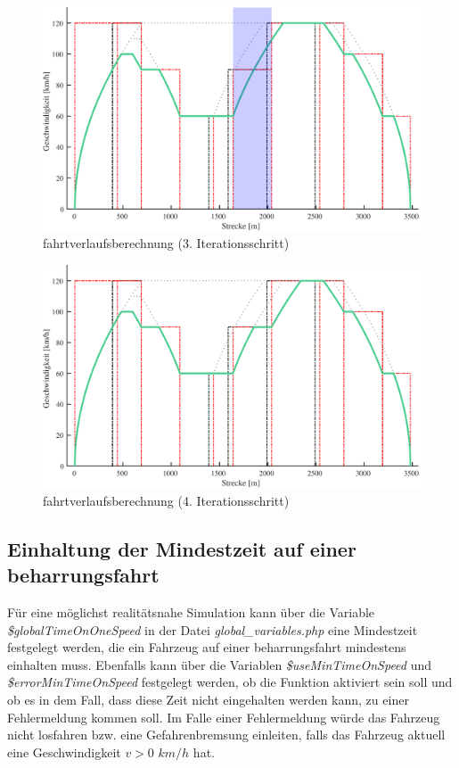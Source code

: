 \begin{figure}
\includegraphics[width=\linewidth]{../images/matlab/it5.pdf}
\caption{\Gls{fahrtverlauf}sberechnung (3. Iterationsschritt)}
\label{fig:it5}
\end{figure}
\begin{figure}
\includegraphics[width=\linewidth]{../images/matlab/it6.pdf}
\caption{\Gls{fahrtverlauf}sberechnung (4. Iterationsschritt)}
\label{fig:it6}
\end{figure}
\subsection{Einhaltung der Mindestzeit auf einer \Gls{beharrungsfahrt}} \label{minTime}
Für eine möglichst realitätsnahe Simulation kann über die Variable \textit{\$global\-Time\-On\-One\-Speed} in der Datei \textit{global\_variables.php} eine Mindestzeit festgelegt werden, die ein Fahrzeug auf einer \Gls{beharrungsfahrt} mindestens einhalten muss. Ebenfalls kann über die Variablen \textit{\$useMinTimeOnSpeed} und \textit{\$errorMinTimeOnSpeed} festgelegt werden, ob die Funktion aktiviert sein soll und ob es in dem Fall, dass diese Zeit nicht eingehalten werden kann, zu einer Fehlermeldung kommen soll. Im Falle einer Fehlermeldung würde das Fahrzeug nicht losfahren bzw. eine Gefahrenbremsung einleiten, falls das Fahrzeug aktuell eine Geschwindigkeit $v > 0$ $km/h$ hat. 

